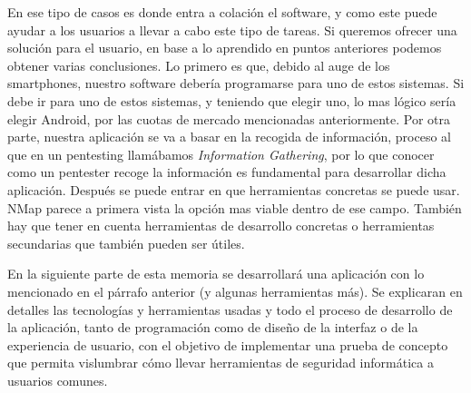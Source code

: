 En ese tipo de casos es donde entra a colación el software, y como este puede ayudar a los usuarios a llevar a cabo este tipo de tareas. Si queremos ofrecer una solución para el usuario, en base a lo aprendido en puntos anteriores podemos obtener varias conclusiones. Lo primero es que, debido al auge de los smartphones, nuestro software debería programarse para uno de estos sistemas. Si debe ir para uno de estos sistemas, y teniendo que elegir uno, lo mas lógico sería elegir Android, por las cuotas de mercado mencionadas anteriormente. Por otra parte, nuestra aplicación se va a basar en la recogida de información, proceso al que en un pentesting llamábamos \textit{Information Gathering}, por lo que conocer como un pentester recoge la información es fundamental para desarrollar dicha aplicación. Después se puede entrar en que herramientas concretas se puede usar. NMap parece a primera vista la opción mas viable dentro de ese campo. También hay que tener en cuenta herramientas de desarrollo concretas o herramientas secundarias que también pueden ser útiles.

En la siguiente parte de esta memoria se desarrollará una aplicación con lo mencionado en el párrafo anterior (y algunas herramientas más). Se explicaran en detalles las tecnologías y herramientas usadas y todo el proceso de desarrollo de la aplicación, tanto de programación como de diseño de la interfaz o de la experiencia de usuario, con el objetivo de implementar una prueba de concepto que permita vislumbrar cómo llevar herramientas de seguridad informática a usuarios comunes.